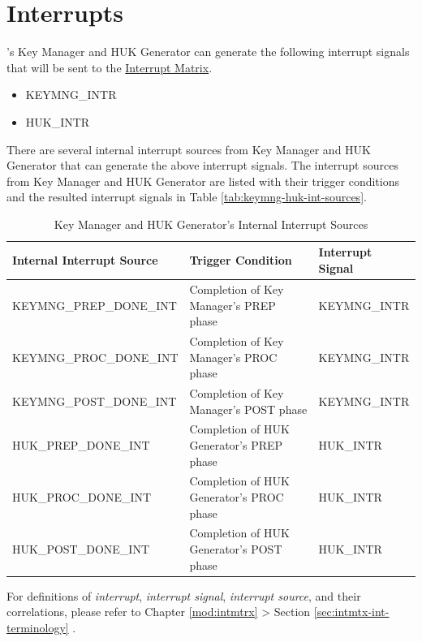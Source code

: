 \documentclass[main\_\_EN.tex]{subfiles}
\begin{document}
\section{Interrupts}

\chipname{}'s Key Manager and HUK Generator can generate the following interrupt signals that will be sent to the \hyperref[mod:intmtrx]{Interrupt Matrix}.

    \begin{itemize}
        \item KEYMNG\_INTR
        \item HUK\_INTR
    \end{itemize}

There are several internal interrupt sources from Key Manager and HUK Generator that can generate the above interrupt signals. The interrupt sources from Key Manager and HUK Generator are listed with their trigger conditions and the resulted interrupt signals in Table \ref{tab:keymng-huk-int-sources}.

\begin{longtable}{ | L{4.5cm} | L{8cm} | L{3cm} | }
\caption{Key Manager and HUK Generator's Internal Interrupt Sources} \label{tab:keymng-huk-int-sources}
\\ \hline
{}
\textbf{Internal Interrupt Source} & \textbf{Trigger Condition}  &  \textbf{Interrupt Signal}\\ \hline
\label{int:KEYMNGPREPDONEINT}KEYMNG\_PREP\_DONE\_INT  &  Completion of Key Manager's PREP phase &  KEYMNG\_INTR  \\ \hline
\label{int:KEYMNGPROCDONEINT}KEYMNG\_PROC\_DONE\_INT  &  Completion of Key Manager's PROC phase &  KEYMNG\_INTR  \\ \hline
\label{int:KEYMNGPOSTDONEINT}KEYMNG\_POST\_DONE\_INT  &  Completion of Key Manager's POST phase &  KEYMNG\_INTR  \\ \hline
\label{int:HUKPREPDONEINT}HUK\_PREP\_DONE\_INT  &  Completion of HUK Generator's PREP phase &  HUK\_INTR  \\ \hline
\label{int:HUKPROCDONEINT}HUK\_PROC\_DONE\_INT  &  Completion of HUK Generator's PROC phase &  HUK\_INTR  \\ \hline
\label{int:HUKPOSTDONEINT}HUK\_POST\_DONE\_INT  &  Completion of HUK Generator's POST phase &  HUK\_INTR  \\ \hline
\end{longtable}

\begin{tiplisting}
For definitions of \textit{interrupt}, \textit{interrupt signal}, \textit{interrupt source}, and their correlations, please refer to Chapter \ref{mod:intmtrx} \textit{} > Section \ref{sec:intmtx-int-terminology} \textit{}.
\end{tiplisting}
\end{document}
